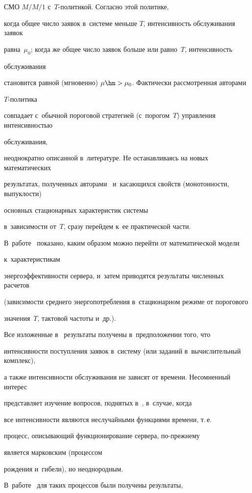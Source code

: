 СМО $M/M/1$ с~$T$-по\-ли\-ти\-кой. Согласно этой политике,

когда общее число заявок в~системе меньше $T$, интенсивность обслуживания заявок

равна~$\mu_0$; когда же общее число заявок больше или равно~$T$, интенсивность 

обслуживания

становится равной (мгновенно) $\mu\hm>\mu_0$. Фактически рассмотренная авторами 

$T$-по\-ли\-ти\-ка

совпадает с~обычной пороговой стратегией (с~порогом~$T$) управления интенсивностью 

обслуживания,

неоднократно описанной в~литературе. Не останавливаясь на новых математических 

результатах, полученных авторами~\cite{a2} и~касающихся свойств (монотонности, выпуклости) 

основных стационарных характеристик системы

в~зависимости от~$T$, сразу перейдем к~ее практической части.

В~работе~\cite{a2} показано, каким образом можно перейти от математической модели 

к~характеристикам

энергоэффективности сервера, и~затем приводятся результаты численных расчетов 

(зависимости среднего энергопотребления в~стационарном режиме от порогового 

значения~$T$, тактовой частоты и~др.).

Все изложенные в~\cite{a2} результаты получены в~предположении того, что

интенсивности поступления заявок в~систему (или заданий в~вычислительный комплекс),

а также интенсивности обслуживания не зависят от времени. Несомненный интерес

представляет изучение вопросов, поднятых в~\cite{a2}, в~случае, когда

все интенсивности являются неслучайными функциями времени, т.\,е.\

процесс, описывающий функционирование сервера, по-преж\-не\-му 

является марковским (процессом

рож\-де\-ния и~гибели), но неоднородным.

В~работе~\cite{a12} для таких процессов были получены результаты,

